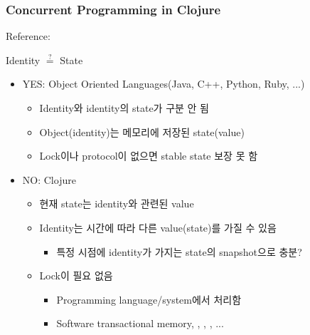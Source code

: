 \begin{frame}[fragile]
\frametitle{Concurrent Programming in Clojure}
Reference: 

\begin{center}
Identity $\stackrel{?}{=}$ State
\end{center}

\begin{itemize}
\item YES: Object Oriented Languages(Java, C++, Python, Ruby, ...)
  \begin{itemize}
  \item Identity와 identity의 state가 구분 안 됨
  \item Object(identity)는 메모리에 저장된 state(value)
  \item Lock이나 protocol이 없으면 stable state 보장 못 함
  \end{itemize}
\item NO: Clojure
  \begin{itemize}
  \item 현재 state는 identity와 관련된 value
  \item Identity는 시간에 따라 다른 value(state)를 가질 수 있음
    \begin{itemize}
    \item 특정 시점에 identity가 가지는 state의 snapshot으로 충분?
    \end{itemize}
  \item Lock이 필요 없음
    \begin{itemize}
    \item Programming language/system에서 처리함
    \item Software transactional memory, , , , ...
    \end{itemize}
  \end{itemize}
\end{itemize}

\end{frame}


